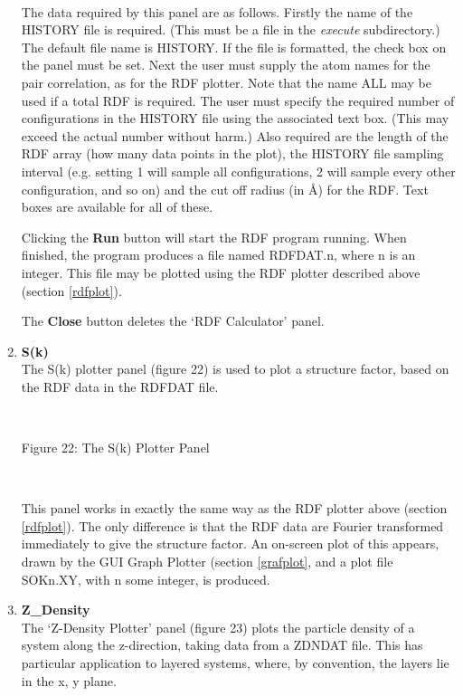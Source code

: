 \begin{enumerate}
~

\noindent
The data required by this panel are as follows. Firstly the name of
the HISTORY file is required. (This must be a file in the {\em
execute} subdirectory.) The default file name is HISTORY. If the file
is formatted, the check box on the panel must be set. Next the user
must supply the atom names for the pair correlation, as for the RDF
plotter. Note that the name ALL may be used if a total RDF is
required.  The user must specify the required number of
configurations in the HISTORY file using the associated text
box. (This may exceed the actual number without harm.) Also required
are the length of the RDF array (how many data points in the plot),
the HISTORY file sampling interval (e.g. setting 1 will sample all
configurations, 2 will sample every other configuration, and so on)
and the cut off radius (in \AA) for the RDF. Text boxes are
available for all of these.

Clicking the {\bf Run} button will start the RDF program running. When
finished, the program produces a file named RDFDAT.n, where n is an integer.
This file may be plotted using the RDF plotter described above (section
\ref{rdfplot}).

The {\bf Close} button deletes the `RDF Calculator' panel.

\item {\bf S(k)}\\
The S(k) plotter panel (figure 22) is used to plot a structure factor,
based on the RDF data in the RDFDAT file.

~

\vskip 5mm
\centerline{}
\centerline{Figure 22: The S(k) Plotter Panel}
\vskip 5mm

~

\noindent
This panel works in exactly the same way as the RDF plotter above
(section \ref{rdfplot}). The only difference is that the RDF data are
Fourier transformed immediately to give the structure factor. An
on-screen plot of this appears, drawn by the GUI Graph Plotter
(section \ref{grafplot}, and a plot file SOKn.XY, with n some integer,
is produced.

\item {\bf Z\_Density}\\
The `Z-Density Plotter' panel (figure 23) plots the particle density
of a system along the z-direction, taking data from a \DD{} ZDNDAT
file. This has particular application to layered systems, where, by
convention, the layers lie in the x, y plane.


\end{enumerate}
